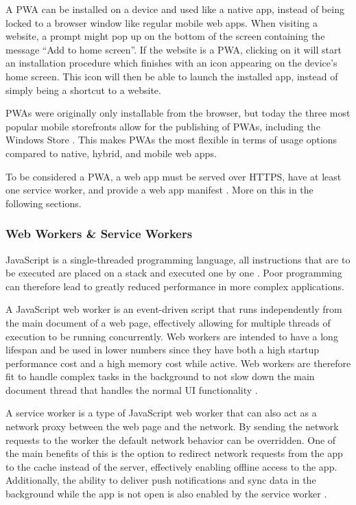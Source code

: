 \documentclass[a4paper,12pt]{article}
\begin{document}
A PWA can be installed on a device and used like a native app, instead of being locked to a browser window like regular mobile web apps. When visiting a website, a prompt might pop up on the bottom of the screen containing the message “Add to home screen”. If the website is a PWA, clicking on it will start an installation procedure which finishes with an icon appearing on the device’s home screen. This icon will then be able to launch the installed app, instead of simply being a shortcut to a website.

PWAs were originally only installable from the browser, but today the three most popular mobile storefronts allow for the publishing of PWAs, including the Windows Store \cite{how_to_publish_pwa_in_stores}. This makes PWAs the most flexible in terms of usage options compared to native, hybrid, and mobile web apps.

To be considered a PWA, a web app must be served over HTTPS, have at least one service worker, and provide a web app manifest \cite{serviceworker_efficiency}. More on this in the following sections.

\subsubsection{Web Workers \& Service Workers}
\label{Theory_PWA_serviceWorkers}
JavaScript is a single-threaded programming language, all instructions that are to be executed are placed on a stack and executed one by one \cite{mozilla_js}. Poor programming can therefore lead to greatly reduced performance in more complex applications.

A JavaScript web worker is an event-driven script that runs independently from the main document of a web page, effectively allowing for multiple threads of execution to be running concurrently. Web workers are intended to have a long lifespan and be used in lower numbers since they have both a high startup performance cost and a high memory cost while active. Web workers are therefore fit to handle complex tasks in the background to not slow down the main document thread that handles the normal UI functionality \cite{workers_html_spec}.

A service worker is a type of JavaScript web worker that can also act as a network proxy between the web page and the network. By sending the network requests to the worker the default network behavior can be overridden. One of the main benefits of this is the option to redirect network requests from the app to the cache instead of the server, effectively enabling offline access to the app. Additionally, the ability to deliver push notifications and sync data in the background while the app is not open is also enabled by the service worker \cite{service_workers_spec}.
\end{document}
